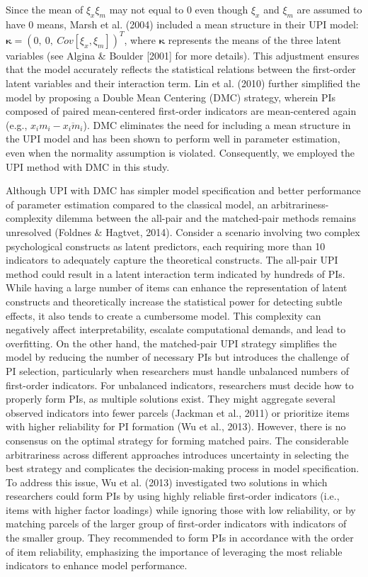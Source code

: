 \documentclass[
  man]{apa6}
\begin{document}
Since the mean of \(\xi_{x}\xi_{m}\) may not equal to 0 even though \(\xi_{x}\) and \(\xi_{m}\) are assumed to have 0 means, Marsh et al. (2004) included a mean structure in their UPI model: \(\mathbf{\kappa} = (0,\ 0,\ Cov[\xi_{x}, \xi_{m}])^T\), where \(\mathbf{\kappa}\) represents the means of the three latent variables (see Algina \& Boulder {[}2001{]} for more details). This adjustment ensures that the model accurately reflects the statistical relations between the first-order latent variables and their interaction term. Lin et al. (2010) further simplified the model by proposing a Double Mean Centering (DMC) strategy, wherein PIs composed of paired mean-centered first-order indicators are mean-centered again (e.g., \(x_{i}m_{i} - \overline{x_{i}m_{i}}\)). DMC eliminates the need for including a mean structure in the UPI model and has been shown to perform well in parameter estimation, even when the normality assumption is violated. Consequently, we employed the UPI method with DMC in this study.

Although UPI with DMC has simpler model specification and better performance of parameter estimation compared to the classical model, an arbitrariness-complexity dilemma between the all-pair and the matched-pair methods remains unresolved (Foldnes \& Hagtvet, 2014). Consider a scenario involving two complex psychological constructs as latent predictors, each requiring more than 10 indicators to adequately capture the theoretical constructs. The all-pair UPI method could result in a latent interaction term indicated by hundreds of PIs. While having a large number of items can enhance the representation of latent constructs and theoretically increase the statistical power for detecting subtle effects, it also tends to create a cumbersome model. This complexity can negatively affect interpretability, escalate computational demands, and lead to overfitting. On the other hand, the matched-pair UPI strategy simplifies the model by reducing the number of necessary PIs but introduces the challenge of PI selection, particularly when researchers must handle unbalanced numbers of first-order indicators. For unbalanced indicators, researchers must decide how to properly form PIs, as multiple solutions exist. They might aggregate several observed indicators into fewer parcels (Jackman et al., 2011) or prioritize items with higher reliability for PI formation (Wu et al., 2013). However, there is no consensus on the optimal strategy for forming matched pairs. The considerable arbitrariness across different approaches introduces uncertainty in selecting the best strategy and complicates the decision-making process in model specification. To address this issue, Wu et al. (2013) investigated two solutions in which researchers could form PIs by using highly reliable first-order indicators (i.e., items with higher factor loadings) while ignoring those with low reliability, or by matching parcels of the larger group of first-order indicators with indicators of the smaller group. They recommended to form PIs in accordance with the order of item reliability, emphasizing the importance of leveraging the most reliable indicators to enhance model performance.
\end{document}
